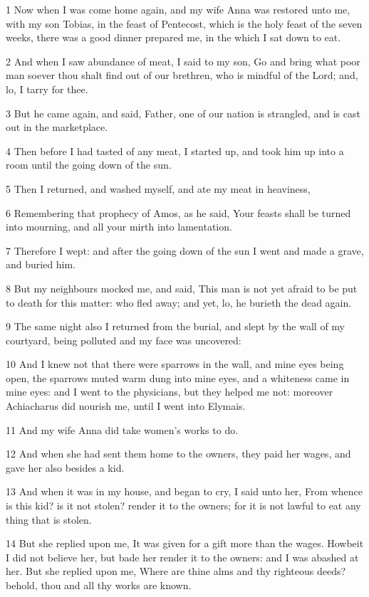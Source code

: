 \par 1 Now when I was come home again, and my wife Anna was restored unto me, with my son Tobias, in the feast of Pentecost, which is the holy feast of the seven weeks, there was a good dinner prepared me, in the which I sat down to eat.
\par 2 And when I saw abundance of meat, I said to my son, Go and bring what poor man soever thou shalt find out of our brethren, who is mindful of the Lord; and, lo, I tarry for thee.
\par 3 But he came again, and said, Father, one of our nation is strangled, and is cast out in the marketplace.
\par 4 Then before I had tasted of any meat, I started up, and took him up into a room until the going down of the sun.
\par 5 Then I returned, and washed myself, and ate my meat in heaviness,
\par 6 Remembering that prophecy of Amos, as he said, Your feasts shall be turned into mourning, and all your mirth into lamentation.
\par 7 Therefore I wept: and after the going down of the sun I went and made a grave, and buried him.
\par 8 But my neighbours mocked me, and said, This man is not yet afraid to be put to death for this matter: who fled away; and yet, lo, he burieth the dead again.
\par 9 The same night also I returned from the burial, and slept by the wall of my courtyard, being polluted and my face was uncovered:
\par 10 And I knew not that there were sparrows in the wall, and mine eyes being open, the sparrows muted warm dung into mine eyes, and a whiteness came in mine eyes: and I went to the physicians, but they helped me not: moreover Achiacharus did nourish me, until I went into Elymais.
\par 11 And my wife Anna did take women's works to do.
\par 12 And when she had sent them home to the owners, they paid her wages, and gave her also besides a kid.
\par 13 And when it was in my house, and began to cry, I said unto her, From whence is this kid? is it not stolen? render it to the owners; for it is not lawful to eat any thing that is stolen.
\par 14 But she replied upon me, It was given for a gift more than the wages. Howbeit I did not believe her, but bade her render it to the owners: and I was abashed at her. But she replied upon me, Where are thine alms and thy righteous deeds? behold, thou and all thy works are known.

